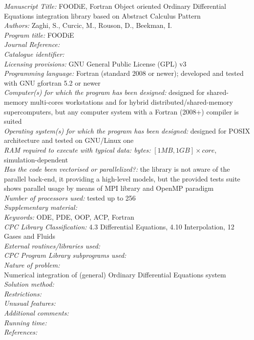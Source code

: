 \documentclass[pdftex,preprint,3p,times,numbers]{elsarticle}
\begin{document}
\begin{small}
\noindent
\emph{Manuscript Title:} FOODiE, Fortran Object oriented Ordinary Differential Equations integration library based on Abstract Calculus Pattern \\
\emph{Authors:} Zaghi, S., Curcic, M., Rouson, D., Beekman, I. \\
\emph{Program title:} FOODiE \\
\emph{Journal Reference:} \\
\emph{Catalogue identifier:} \\
\emph{Licensing provisions:} GNU General Public License (GPL) v3 \\
\emph{Programming language:} Fortran (standard 2008 or newer); developed and tested with GNU gfortran 5.2 or newer \\
\emph{Computer(s) for which the program has been designed:} designed for shared-memory multi-cores workstations and for hybrid distributed/shared-memory supercomputers, but any computer system with a Fortran (2008+) compiler is suited \\
\emph{Operating system(s) for which the program has been designed:} designed for POSIX architecture and tested on GNU/Linux one \\
\emph{RAM required to execute with typical data: bytes:} $[1MB,1GB]\times core$, simulation-dependent \\
\emph{Has the code been vectorised or parallelized?:} the library is not aware of the parallel back-end, it providing a high-level models, but the provided tests suite shows parallel usage by means of MPI library and OpenMP paradigm \\
\emph{Number of processors used:} tested up to 256 \\
\emph{Supplementary material:}    \\
\emph{Keywords:} ODE, PDE, OOP, ACP, Fortran \\
\emph{CPC Library Classification:} 4.3 Differential Equations, 4.10 Interpolation, 12 Gases and Fluids \\
\emph{External routines/libraries used:} \\
\emph{CPC Program Library subprograms used:} \\
\emph{Nature of problem:} \\
Numerical integration of (general) Ordinary Differential Equations system \\
\emph{Solution method:} \\
\emph{Restrictions:} \\
\emph{Unusual features:} \\
\emph{Additional comments:} \\
\emph{Running time:} \\
\emph{References:} \\
\end{small}
\end{document}
